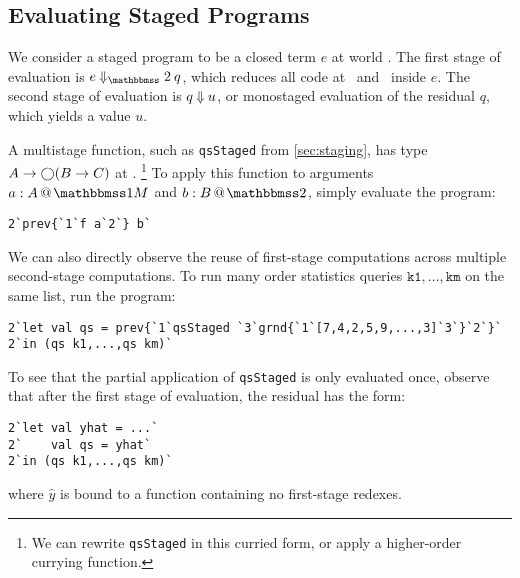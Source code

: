 

\subsection{Evaluating Staged Programs}

We consider a staged program to be a closed term $e$ at world \bbtwo. The first
stage of evaluation is $e\mathbin{\redtwosym} q$, which reduces all code at
\bbonem\ and \bbonep\ inside $e$. The second stage of evaluation is $q
\mathbin{{\Downarrow}} u$, or monostaged evaluation of the residual $q$, which yields
a value $u$.

A multistage function, such as \texttt{qsStaged} from \ref{sec:staging}, has
type $A\to \bigcirc (B \to C)$ at \bbonem.%
\footnote{We can rewrite \texttt{qsStaged} in this curried form, or apply a
higher-order currying function.}
To apply this function to arguments $\colmix a A$ and $\coltwo b B$, simply
evaluate the program:
\begin{lstlisting}
2`prev{`1`f a`2`} b`
\end{lstlisting}

We can also directly observe the reuse of first-stage computations across
multiple second-stage computations. To run many order statistics queries
$\texttt{k1},\dots,\texttt{km}$ on the same list, run the program:
\begin{lstlisting}
2`let val qs = prev{`1`qsStaged `3`grnd{`1`[7,4,2,5,9,...,3]`3`}`2`}`
2`in (qs k1,...,qs km)`
\end{lstlisting}
To see that the partial application of \texttt{qsStaged} is only evaluated once,
observe that after the first stage of evaluation, the residual has the form:
\begin{lstlisting}
2`let val yhat = ...`
2`    val qs = yhat`
2`in (qs k1,...,qs km)`
\end{lstlisting}
where $\hat{y}$ is bound to a function containing no first-stage redexes.
